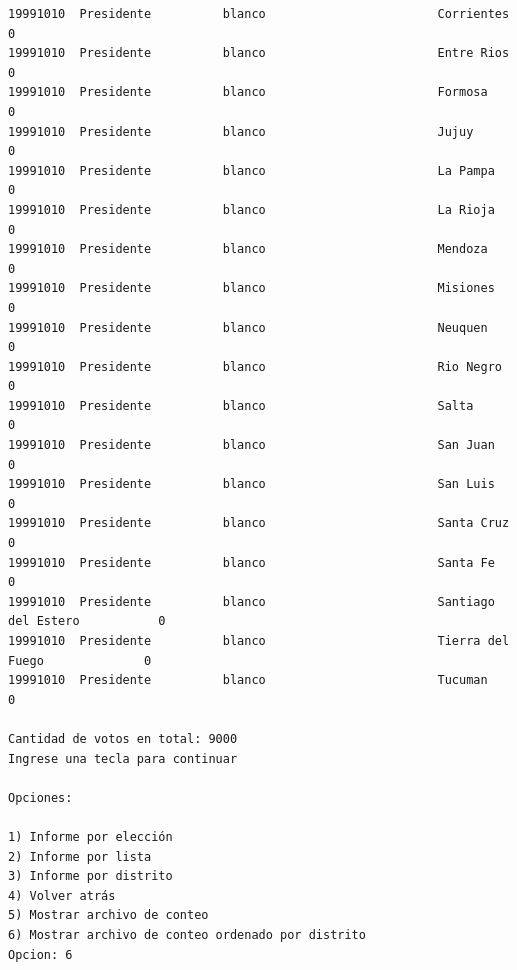 \documentclass[a4paper,10pt]{article}
\begin{document}
\begin{verbatim}
19991010  Presidente          blanco                        Corrientes                    0              
19991010  Presidente          blanco                        Entre Rios                    0              
19991010  Presidente          blanco                        Formosa                       0              
19991010  Presidente          blanco                        Jujuy                         0              
19991010  Presidente          blanco                        La Pampa                      0              
19991010  Presidente          blanco                        La Rioja                      0              
19991010  Presidente          blanco                        Mendoza                       0              
19991010  Presidente          blanco                        Misiones                      0              
19991010  Presidente          blanco                        Neuquen                       0              
19991010  Presidente          blanco                        Rio Negro                     0              
19991010  Presidente          blanco                        Salta                         0              
19991010  Presidente          blanco                        San Juan                      0              
19991010  Presidente          blanco                        San Luis                      0              
19991010  Presidente          blanco                        Santa Cruz                    0              
19991010  Presidente          blanco                        Santa Fe                      0              
19991010  Presidente          blanco                        Santiago del Estero           0              
19991010  Presidente          blanco                        Tierra del Fuego              0              
19991010  Presidente          blanco                        Tucuman                       0              

Cantidad de votos en total: 9000
Ingrese una tecla para continuar

Opciones: 

1) Informe por elección
2) Informe por lista
3) Informe por distrito
4) Volver atrás
5) Mostrar archivo de conteo
6) Mostrar archivo de conteo ordenado por distrito
Opcion: 6


\end{verbatim}
\end{document}
